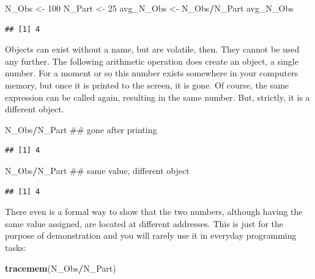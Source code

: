 \documentclass[]{svmono}
\newenvironment{Shaded}{\begin{snugshade}}{\end{snugshade}}
\newcommand{\KeywordTok}[1]{\textcolor[rgb]{0.13,0.29,0.53}{\textbf{#1}}}
\newcommand{\DecValTok}[1]{\textcolor[rgb]{0.00,0.00,0.81}{#1}}
\newcommand{\StringTok}[1]{\textcolor[rgb]{0.31,0.60,0.02}{#1}}
\newcommand{\OperatorTok}[1]{\textcolor[rgb]{0.81,0.36,0.00}{\textbf{#1}}}
\newcommand{\NormalTok}[1]{#1}
\theoremstyle{definition}
\theoremstyle{definition}
\theoremstyle{definition}
\theoremstyle{remark}
\begin{document}
\begin{Shaded}
\begin{Highlighting}[]
\NormalTok{N_Obs <-}\StringTok{ }\DecValTok{100}
\NormalTok{N_Part <-}\StringTok{ }\DecValTok{25}
\NormalTok{avg_N_Obs <-}\StringTok{ }\NormalTok{N_Obs}\OperatorTok{/}\NormalTok{N_Part}
\NormalTok{avg_N_Obs}
\end{Highlighting}
\end{Shaded}

\begin{verbatim}
## [1] 4
\end{verbatim}

Objects can exist without a name, but are volatile, then. They cannot be
used any further. The following arithmetic operation does create an
object, a single number. For a moment or so this number exists somewhere
in your computers memory, but once it is printed to the screen, it is
gone. Of course, the same expression can be called again, resulting in
the same number. But, strictly, it is a different object.

\begin{Shaded}
\begin{Highlighting}[]
\NormalTok{N_Obs}\OperatorTok{/}\NormalTok{N_Part ## gone after printing}
\end{Highlighting}
\end{Shaded}

\begin{verbatim}
## [1] 4
\end{verbatim}

\begin{Shaded}
\begin{Highlighting}[]
\NormalTok{N_Obs}\OperatorTok{/}\NormalTok{N_Part ## same value, different object}
\end{Highlighting}
\end{Shaded}

\begin{verbatim}
## [1] 4
\end{verbatim}

There even is a formal way to show that the two numbers, although having
the same value assigned, are located at different addresses. This is
just for the purpose of demonstration and you will rarely use it in
everyday programming tasks:

\begin{Shaded}
\begin{Highlighting}[]
\KeywordTok{tracemem}\NormalTok{(N_Obs}\OperatorTok{/}\NormalTok{N_Part)}
\end{Highlighting}
\end{Shaded}
\end{document}
